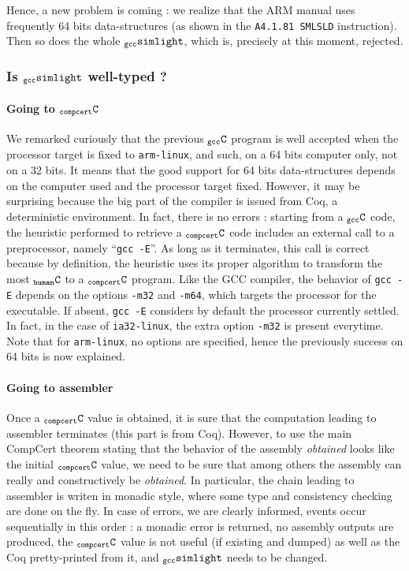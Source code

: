 \documentclass[a4paper, 11pt]{article}
\newcommand{\gccSL}{$_{\tt gcc}{\tt simlight}$\xspace}
\newcommand{\C}{$_{\tt compcert}{\tt C}$\xspace}
\newcommand{\gccC}{$_{\tt gcc}{\tt C}$\xspace}
\newcommand{\hC}{$_{\tt human}{\tt C}$\xspace}
\begin{document}
Hence, a new problem is coming : we realize that the ARM manual uses frequently 64 bits data-structures (as shown in the {\tt A4.1.81 SMLSLD} instruction). Then so does the whole \gccSL, which is, precisely at this moment, rejected.

\subsubsection{Is \gccSL well-typed ?}
\paragraph{Going to \C}
We remarked curiously that the previous \gccC program is well accepted when the processor target is fixed to \verb|arm-linux|, and such, on a 64 bits computer only, not on a 32 bits. It means that the good support for 64 bits data-structures depends on the computer used and the processor target fixed. However, it may be surprising because the big part of the compiler is issued from Coq, a deterministic environment. In fact, there is no errors : starting from a \gccC code, the heuristic performed to retrieve a \C code includes an external call to a preprocessor, namely ``\verb|gcc -E|''. As long as it terminates, this call is correct because by definition, the heuristic uses its proper algorithm to transform the most \hC to a \C program. Like the GCC compiler, the behavior of \verb|gcc -E| depends on the options \verb|-m32| and \verb|-m64|, which targets the processor for the executable. If absent, \verb|gcc -E| considers by default the processor currently settled. In fact, in the case of \verb|ia32-linux|, the extra option \verb|-m32| is present everytime.
Note that for \verb|arm-linux|, no options are specified, hence the previously success on 64 bits is now explained.

\paragraph{Going to assembler}
Once a \C value is obtained, it is sure that the computation leading to assembler terminates (this part is from Coq). However, to use the main CompCert theorem stating that the behavior of the assembly \emph{obtained} looks like the initial \C value, we need to be sure that among others the assembly can really and constructively be \emph{obtained}. In particular, the chain leading to assembler is writen in monadic style, where some type and consistency checking are done on the fly. In case of errors, we are clearly informed, events occur sequentially in this order : a monadic error is returned, no assembly outputs are produced, the \C value is not useful (if existing and dumped) as well as the Coq pretty-printed from it, and \gccSL needs to be changed.
\end{document}
